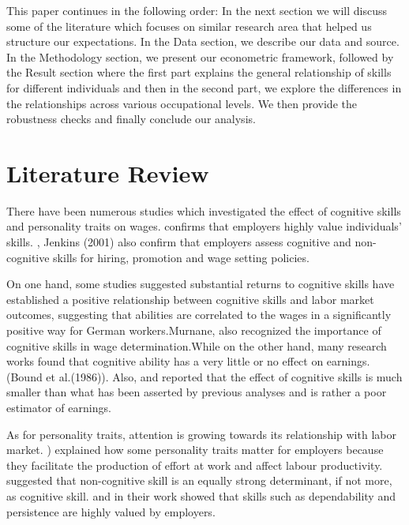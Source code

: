 \documentclass[11pt, a4paper, leqno]{article}
\begin{document}
This paper continues in the following order: In the next section we will discuss some of the literature which focuses on similar research area that helped us structure our expectations. In the Data section, we describe our data and source. In the Methodology section, we present our econometric framework, followed by the Result section where the first part explains the general relationship of skills for different individuals and then in the second part, we explore the differences in the relationships across various occupational levels. We then provide the robustness checks and finally conclude our analysis.

\section*{Literature Review}

There have been numerous studies which investigated the effect of cognitive skills and personality traits on wages.\citet{heineck} confirms that employers highly value individuals’ skills. \citet{farkas}, Jenkins (2001) also confirm that employers assess cognitive and non-cognitive skills for hiring, promotion and wage setting policies.\par

On one hand, some studies suggested substantial returns to cognitive skills \citet{heineck} have established a positive relationship between cognitive skills and labor market outcomes, suggesting that abilities are correlated to the
wages in a significantly positive way for German workers.Murnane, \citet{levy} also recognized the importance of cognitive skills in wage determination.While on the other hand, many research works found that cognitive ability has a very little  or no effect on earnings.(Bound et al.(1986)). Also, \citet{heckman} and  \citet{zax} reported that the effect of cognitive skills is much smaller than what has been asserted by previous analyses and is rather a poor estimator of earnings.\par

As for personality traits, attention is growing towards its relationship with labor market. \citet{Osbornw}) explained how some personality traits matter for employers because they facilitate the production of effort at work and affect labour productivity. 
\citet{Urzua} suggested that non-cognitive skill is an equally strong determinant, if not more, as cognitive skill. \citet{Gintis} and \citet{Edwards} in their work showed that skills such as dependability and persistence are highly valued by employers.\par
\end{document}
